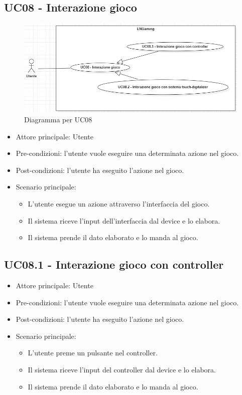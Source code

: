 \subsection{UC08 - Interazione gioco}
\begin{figure}[h]
    \centering
    \includegraphics[width=400pt]{images/usecase/UC08.png}
    \caption{Diagramma per UC08}
    \label{fig:attore}
\end{figure}
\begin{itemize}
    \item Attore principale: Utente
    \item Pre-condizioni: l'utente vuole eseguire una determinata azione nel gioco.
    \item Post-condizioni: l'utente ha eseguito l'azione nel gioco.
    \item Scenario principale: \begin{itemize}
        \item L'utente esegue un azione attraverso l'interfaccia del gioco.
        \item Il sistema riceve l'input dell'interfaccia dal device e lo elabora.
        \item Il sistema prende il dato elaborato e lo manda al gioco.
    \end{itemize}
\end{itemize}

\subsection{UC08.1 - Interazione gioco con controller}
\begin{itemize}
    \item Attore principale: Utente
    \item Pre-condizioni: l'utente vuole eseguire una determinata azione nel gioco.
    \item Post-condizioni: l'utente ha eseguito l'azione nel gioco.
    \item Scenario principale: \begin{itemize}
        \item L'utente preme un pulsante nel controller.
        \item Il sistema riceve l'input del controller dal device e lo elabora.
        \item Il sistema prende il dato elaborato e lo manda al gioco.
    \end{itemize}
\end{itemize}

